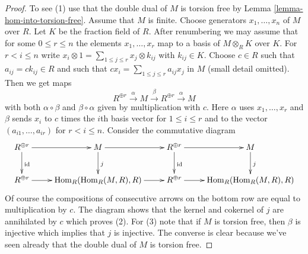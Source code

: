 \documentclass[10pt,a4paper]{amsart}
\theoremstyle{plain}
\theoremstyle{definition}
\theoremstyle{remark}
\numberwithin{equation}{subsection}
\def\Hom{\mathop{\mathrm{Hom}}\nolimits}
\begin{document}
\begin{proof}
To see (1) use that the double dual of $M$ is torsion free by
Lemma \ref{lemma-hom-into-torsion-free}. Assume that $M$ is finite.
Choose generators $x_1, \ldots, x_n$ of $M$ over $R$.
Let $K$ be the fraction field of $R$. After renumbering we
may assume that for some $0 \leq r \leq n$ the elements
$x_1, \ldots, x_r$ map to a basis of $M \otimes_R K$ over $K$.
For $r < i \leq n$ write
$x_i \otimes 1 = \sum_{1 \leq j \leq r} x_j \otimes k_{ij}$ with
$k_{ij} \in K$. Choose $c \in R$ such that $a_{ij} = ck_{ij} \in R$
and such that $cx_i =  \sum_{1 \leq j \leq r} a_{ij} x_j$ in $M$
(small detail omitted). Then we get maps
$$
R^{\oplus r} \xrightarrow{\alpha} M \xrightarrow{\beta} R^{\oplus r}
\xrightarrow{\alpha} M
$$
with both $\alpha \circ \beta$ and $\beta \circ \alpha$
given by multiplication with $c$. Here $\alpha$ uses
$x_1, \ldots, x_r$ and $\beta$ sends $x_i$ to $c$ times the $i$th
basis vector for $1 \leq i \leq r$ and
to the vector $(a_{i1}, \ldots, a_{ir})$ for $r < i \leq n$.
Consider the commutative diagram
$$
\xymatrix{
R^{\oplus r} \ar[r] \ar[d]^{\text{id}} &
M \ar[r] \ar[d]^j &
R^{\oplus r} \ar[d]^{\text{id}} \ar[r] &
M \ar[d]^j \\
R^{\oplus r} \ar[r] &
\Hom_R(\Hom_R(M, R), R) \ar[r] &
R^{\oplus r} \ar[r] &
\Hom_R(\Hom_R(M, R), R)
}
$$
Of course the compositions of consecutive arrows on the bottom row
are equal to multiplication by $c$. The diagram shows that the kernel
and cokernel of $j$ are annihilated by $c$ which proves (2).
For (3) note that if $M$ is torsion free, then
$\beta$ is injective which implies that $j$ is injective.
The converse is clear because we've seen already that the double
dual of $M$ is torsion free.
\end{proof}
\end{document}

